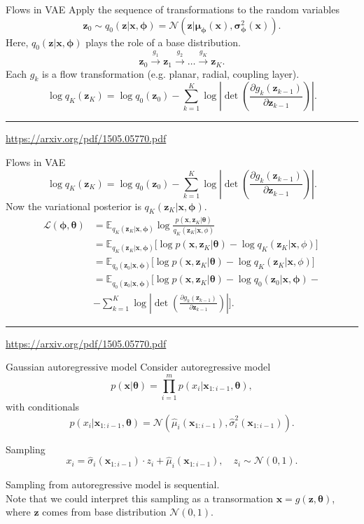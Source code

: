\documentclass{beamer}
\newcommand{\bx}{\mathbf{x}}
\newcommand{\bz}{\mathbf{z}}
\newcommand{\bmu}{\boldsymbol{\mu}}
\newcommand{\bsigma}{\boldsymbol{\sigma}}
\newcommand{\btheta}{\boldsymbol{\theta}}
\newcommand{\bphi}{\boldsymbol{\phi}}
\begin{document}
\begin{frame}{Flows in VAE}
	Apply the sequence of transformations to the random variables 
	\[
	\bz_0 \sim q_0(\bz | \bx, \bphi) = \mathcal{N}(\bz| \bmu_{\bphi}(\bx), \bsigma^2_{\bphi}(\bx)).
	\]
	Here, $q_0(\bz | \bx, \bphi)$ plays the role of a base distribution.
	\[
	\bz_0 \xrightarrow{g_1} \bz_1 \xrightarrow{g_2} \dots \xrightarrow{g_K} \bz_K.
	\]
	Each $g_k $ is a flow transformation (e.g. planar, radial, coupling layer).
	\[
	\log q_K(\bz_K) = \log q_0(\bz_0) - \sum_{k=1}^K \log \left| \det \left( \frac{\partial g_k(\bz_{k - 1})}{\partial \bz_{k-1}} \right) \right|.
	\]
	
	\vfill
	\hrule\medskip
	{\scriptsize \href{https://arxiv.org/pdf/1505.05770.pdf}{https://arxiv.org/pdf/1505.05770.pdf}} 
\end{frame}
\begin{frame}{Flows in VAE}
	\[
	\log q_K(\bz_K) = \log q_0(\bz_0) - \sum_{k=1}^K \log \left| \det \left( \frac{\partial g_k(\bz_{k - 1})}{\partial \bz_{k-1}} \right) \right|.
	\]
	Now the variational posterior is $q_K(\bz_K | \bx, \bphi)$.
	\begin{align*}
		\mathcal{L} (\bphi, \btheta)  &= \mathbb{E}_{q_K(\bz_K | \bx, \bphi)} \log \frac{p(\bx, \bz_K | \btheta)}{q_K(\bz_K| \bx, \phi)} \\
		&= \mathbb{E}_{q_K(\bz_K | \bx, \bphi)} \bigl[\log p(\bx, \bz_K | \btheta) - \log q_K(\bz_K| \bx, \phi) \bigr] \\
		&= \mathbb{E}_{q_0(\bz_0 | \bx, \bphi)} \bigl[\log p(\bx, \bz_K | \btheta) - \log q_K(\bz_K| \bx, \phi) \bigr] \\
		&= \mathbb{E}_{q_0(\bz_0 | \bx, \bphi)} \bigg[\log p(\bx, \bz_K | \btheta) -  \log q_0(\bz_0 | \bx, \bphi ) - \\ & - \sum_{k=1}^K \log \left| \det \left( \frac{\partial g_k(\bz_{k - 1})}{\partial \bz_{k-1}} \right) \right| \bigg].
	\end{align*}
	\vfill
	\hrule\medskip
	{\scriptsize \href{https://arxiv.org/pdf/1505.05770.pdf}{https://arxiv.org/pdf/1505.05770.pdf}} 
\end{frame}
\begin{frame}{Gaussian autoregressive model}
	Consider autoregressive model
	\[
		p(\bx | \btheta) = \prod_{i=1}^m p(x_i | \bx_{1:i - 1}, \btheta),
	\]
	with conditionals
	\[
	p(x_i | \bx_{1:i - 1}, \btheta) = \mathcal{N} \left(\hat{\mu}_i(\bx_{1:i-1}), \hat{\sigma}^2_i (\bx_{1:i-1})\right).
	\]
	\vspace{-0.5cm}
	\begin{block}{Sampling}
		\[
		x_i = \hat{\sigma}_i (\bx_{1:i-1}) \cdot z_i + \hat{\mu}_i(\bx_{1:i-1}), \quad z_i \sim \mathcal{N}(0, 1).
		\]
	\end{block}
	Sampling from autoregressive model is sequential. \\
	Note that we could interpret this sampling as a transormation $\bx = g(\bz, \btheta)$, where $\bz$ comes from base distribution $\mathcal{N}(0, 1)$.
\end{frame}
\end{document}
